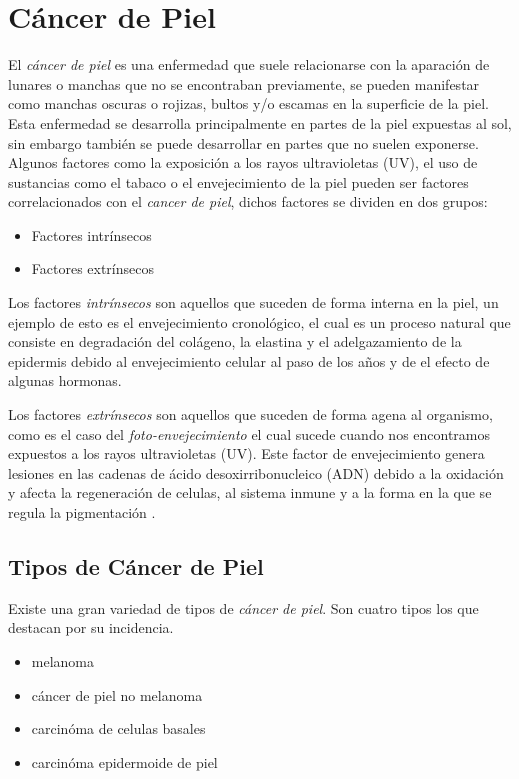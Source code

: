 \section{Cáncer de Piel}
El \emph{cáncer de piel} es una enfermedad que suele relacionarse con la aparación de lunares o manchas que no se encontraban previamente, se pueden manifestar como manchas oscuras o rojizas, bultos y/o escamas en la superficie de la piel. Esta enfermedad se desarrolla principalmente en partes de la piel expuestas al sol, sin embargo también se puede desarrollar en partes que no suelen exponerse. Algunos factores como la exposición a los rayos ultravioletas (UV), el uso de sustancias como el tabaco o el envejecimiento de la piel pueden ser factores correlacionados con el \emph{c{ancer de piel}}, dichos factores se dividen en dos grupos: 

\begin{itemize}
    \item Factores intrínsecos
    \item Factores extrínsecos
\end{itemize}

Los factores \emph{intrínsecos} son aquellos que suceden de forma interna en la piel, un ejemplo de esto es el envejecimiento cronológico, el cual es un proceso natural que consiste en degradación del colágeno, la elastina y el adelgazamiento de la epidermis debido al envejecimiento celular al paso de los años y de el efecto de algunas hormonas.

Los factores \emph{extrínsecos} son aquellos que suceden de forma agena al organismo, como es el caso del \emph{foto-envejecimiento} el cual sucede cuando nos encontramos expuestos a los rayos ultravioletas (UV). Este factor de envejecimiento genera lesiones en las cadenas de ácido desoxirribonucleico (ADN) debido a la oxidación y afecta la regeneración de celulas, al sistema inmune y a la forma en la que se regula la pigmentación \citep{skin_aging}.

\subsection{Tipos de Cáncer de Piel}
Existe una gran variedad de tipos de \emph{cáncer de piel}. Son cuatro tipos los que destacan por su incidencia.

\begin{itemize}
    \item melanoma
    \item cáncer de piel no melanoma
    \item carcinóma de celulas basales
    \item carcinóma epidermoide de piel
\end{itemize}

